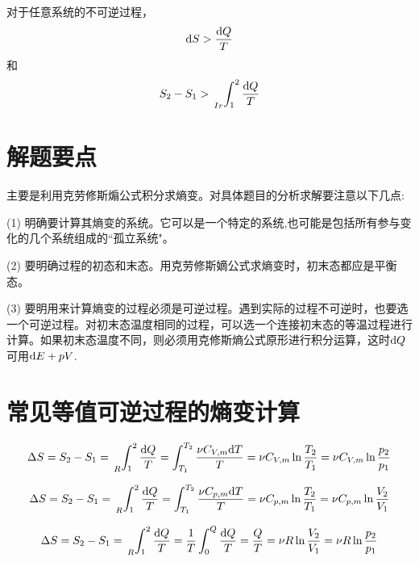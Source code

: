 \par {} 对于任意系统的不可逆过程，
\begin{equation*}
{\rm{d}} S>\frac{{\rm{d}} Q}{T}
\end{equation*}
和
\begin{equation*}
S_2-S_1>\sideset{_{Ir}}{}{\int_{1}^{2}}\frac{{\rm{d}} Q}{T}
\end{equation*}


\section{解题要点}
主要是利用克劳修斯煽公式积分求熵变。对具体题目的分析求解要注意以下几点:
\par (1) 明确要计算其熵变的系统。它可以是一个特定的系统,也可能是包括所有参与变化的几个系统组成的``孤立系统"。\jg
\par (2) 要明确过程的初态和末态。用克劳修斯嫡公式求熵变时，初末态都应是平衡态。
\par (3) 要明用来计算熵变的过程必须是可逆过程。遇到实际的过程不可逆时，也要选一个可逆过程。对初末态温度相同的过程，可以选一个连接初末态的等温过程进行计算。如果初末态温度不同，则必须用克修斯熵公式原形进行积分运算，这时${\rm{d}} Q$可用${\rm{d}} E+pV$.

\section{常见等值可逆过程的熵变计算}
\dya[等体可逆过程的熵变]
\begin{equation*}
\Delta S=S_2-S_1=\sideset{_R}{}{\int_{1}^{2}}\frac{{\rm{d}} Q}{T}=\int_{T_1}^{T_2}\frac{\nu C_{V,m}{\rm{d}} T}{T}=\nu C_{V,m}\ln{\frac{T_2}{T_1}}=\nu C_{V,m}\ln{\frac{p_2}{p_1}}
\end{equation*}

\par \dya[等压可逆过程的熵变]
\begin{equation*}
\Delta S=S_2-S_1=\sideset{_R}{}{\int_{1}^{2}}\frac{{\rm{d}} Q}{T}=\int_{T_1}^{T_2}\frac{\nu C_{p,m}{\rm{d}} T}{T}=\nu C_{p,m}\ln{\frac{T_2}{T_1}}=\nu C_{p,m}\ln{\frac{V_2}{V_1}}
\end{equation*}

\par \dya[等温可逆过程的熵变]
\begin{equation*}
\Delta S=S_2-S_1=\sideset{_R}{}{\int_{1}^{2}}\frac{{\rm{d}} Q}{T}=\frac{1}{T}\int_{0}^{Q}\frac{{\rm{d}} Q}{T}=\frac{Q}{T}=\nu R \ln{\frac{V_2}{V_1}}=\nu R \ln{\frac{p_2}{p_1}}
\end{equation*}

